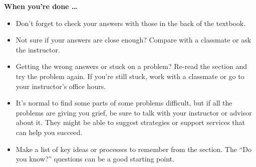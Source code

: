 \begin{enumerate}
\end{enumerate}

\bigskip

\noindent \textbf{When you're done \ldots}

\begin{itemize}
\item Don't forget to check your answers with those in the back of the textbook. 
\item Not sure if your answers are close enough? Compare with a classmate or ask the instructor.  
\item Getting the wrong answers or stuck on a problem?  Re-read the section and try the problem again. If you're still stuck, work with a classmate or go to your instructor's office hours.
\item It's normal to find some parts of some problems difficult, but if all the problems are giving you grief, be sure to talk with your instructor or advisor about it.  They might be able to suggest strategies or support services that can help you succeed.
\item Make a list of key ideas or processes to remember from the section.  The ``Do you know?'' questions can be a good starting point.
\end{itemize}


